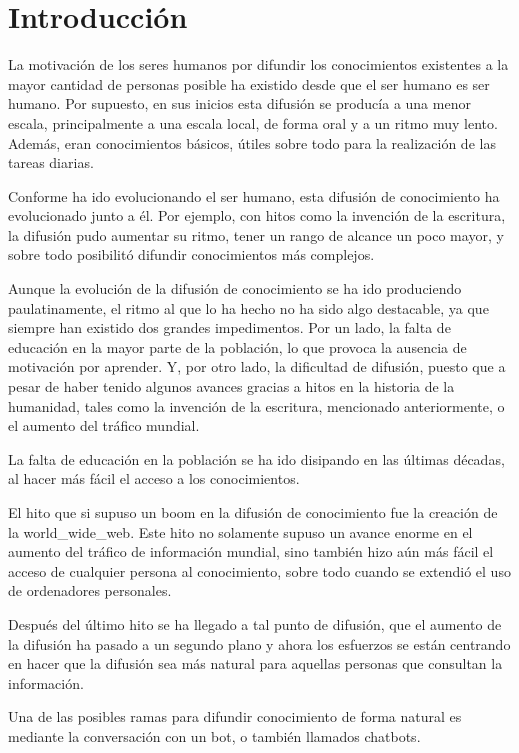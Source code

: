 \chapter{Introducción}

La motivación de los seres humanos por difundir los conocimientos existentes a la mayor cantidad de personas posible ha existido desde que el ser humano es ser humano. Por supuesto, en sus inicios esta difusión se producía a una menor escala, principalmente a una escala local, de forma oral y a un ritmo muy lento. Además, eran conocimientos básicos, útiles sobre todo para la realización de las tareas diarias.

Conforme ha ido evolucionando el ser humano, esta difusión de conocimiento ha evolucionado junto a él. Por ejemplo, con hitos como la invención de la escritura, la difusión pudo aumentar su ritmo, tener un rango de alcance un poco mayor, y sobre todo posibilitó difundir conocimientos más complejos.

Aunque la evolución de la difusión de conocimiento se ha ido produciendo paulatinamente, el ritmo al que lo ha hecho no ha sido algo destacable, ya que siempre han existido dos grandes impedimentos. Por un lado, la falta de educación en la mayor parte de la población, lo que provoca la ausencia de motivación por aprender. Y, por otro lado, la dificultad de difusión, puesto que a pesar de haber tenido algunos avances gracias a hitos en la historia de la humanidad, tales como la invención de la escritura, mencionado anteriormente, o el aumento del tráfico mundial.

La falta de educación en la población se ha ido disipando en las últimas décadas, al hacer más fácil el acceso a los conocimientos.

El hito que si supuso un boom en la difusión de conocimiento fue la creación de la \gls{world_wide_web}. Este hito no solamente supuso un avance enorme en el aumento del tráfico de información mundial, sino también hizo aún más fácil el acceso de cualquier persona al conocimiento, sobre todo cuando se extendió el uso de ordenadores personales.

Después del último hito se ha llegado a tal punto de difusión, que el aumento de la difusión ha pasado a un segundo plano y ahora los esfuerzos se están centrando en hacer que la difusión sea más natural para aquellas personas que consultan la información.

Una de las posibles ramas para difundir conocimiento de forma natural es mediante la conversación con un \gls{bot}, o también llamados \glspl{chatbot}.

